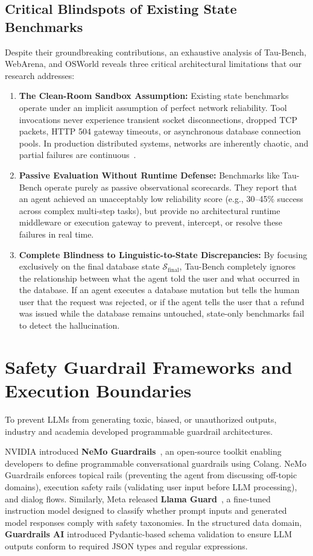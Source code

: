 \subsection{Critical Blindspots of Existing State Benchmarks}
Despite their groundbreaking contributions, an exhaustive analysis of Tau-Bench, WebArena, and OSWorld reveals three critical architectural limitations that our research addresses:
\begin{enumerate}
    \item \textbf{The Clean-Room Sandbox Assumption:} Existing state benchmarks operate under an implicit assumption of perfect network reliability. Tool invocations never experience transient socket disconnections, dropped TCP packets, HTTP 504 gateway timeouts, or asynchronous database connection pools. In production distributed systems, networks are inherently chaotic, and partial failures are continuous~\cite{tanenbaum2007distributed}.
    \item \textbf{Passive Evaluation Without Runtime Defense:} Benchmarks like Tau-Bench operate purely as passive observational scorecards. They report that an agent achieved an unacceptably low reliability score (e.g., 30--45\% success across complex multi-step tasks), but provide no architectural runtime middleware or execution gateway to prevent, intercept, or resolve these failures in real time.
    \item \textbf{Complete Blindness to Linguistic-to-State Discrepancies:} By focusing exclusively on the final database state $\mathcal{S}_{\text{final}}$, Tau-Bench completely ignores the relationship between what the agent told the user and what occurred in the database. If an agent executes a database mutation but tells the human user that the request was rejected, or if the agent tells the user that a refund was issued while the database remains untouched, state-only benchmarks fail to detect the hallucination.
\end{enumerate}

\section{Safety Guardrail Frameworks and Execution Boundaries}
\label{sec:lit_guardrails}
To prevent LLMs from generating toxic, biased, or unauthorized outputs, industry and academia developed programmable guardrail architectures.

NVIDIA introduced \textbf{NeMo Guardrails}~\cite{rebedea2023nemo}, an open-source toolkit enabling developers to define programmable conversational guardrails using Colang. NeMo Guardrails enforces topical rails (preventing the agent from discussing off-topic domains), execution safety rails (validating user input before LLM processing), and dialog flows. Similarly, Meta released \textbf{Llama Guard}~\cite{inan2023llama}, a fine-tuned instruction model designed to classify whether prompt inputs and generated model responses comply with safety taxonomies. In the structured data domain, \textbf{Guardrails AI} introduced Pydantic-based schema validation to ensure LLM outputs conform to required JSON types and regular expressions.


